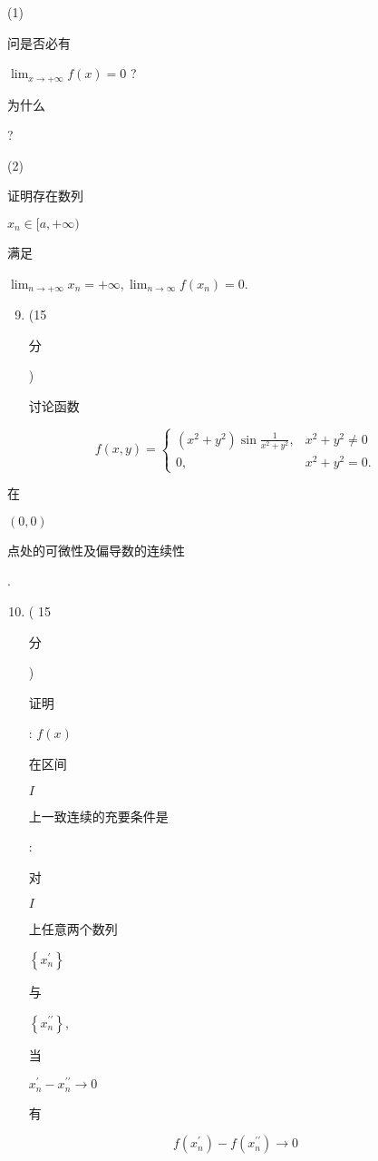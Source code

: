 \documentclass[10pt]{article}
\begin{document}
(1) \begin{CJK}{UTF8}{mj}问是否必有\end{CJK} $\lim _{x \rightarrow+\infty} f(x)=0$ ? \begin{CJK}{UTF8}{mj}为什么\end{CJK}?

(2) \begin{CJK}{UTF8}{mj}证明存在数列\end{CJK} $x_{n} \in[a,+\infty)$ \begin{CJK}{UTF8}{mj}满足\end{CJK} $\lim _{n \rightarrow+\infty} x_{n}=+\infty, \lim _{n \rightarrow \infty} f\left(x_{n}\right)=0$.

\begin{enumerate}
  \setcounter{enumi}{8}
  \item (15 \begin{CJK}{UTF8}{mj}分\end{CJK}) \begin{CJK}{UTF8}{mj}讨论函数\end{CJK}
\end{enumerate}
$$
f(x, y)= \begin{cases}\left(x^{2}+y^{2}\right) \sin \frac{1}{x^{2}+y^{2}}, & x^{2}+y^{2} \neq 0 \\ 0, & x^{2}+y^{2}=0 .\end{cases}
$$
\begin{CJK}{UTF8}{mj}在\end{CJK} $(0,0)$ \begin{CJK}{UTF8}{mj}点处的可微性及偏导数的连续性\end{CJK}.

\begin{enumerate}
  \setcounter{enumi}{9}
  \item ( 15 \begin{CJK}{UTF8}{mj}分\end{CJK}) \begin{CJK}{UTF8}{mj}证明\end{CJK}: $f(x)$ \begin{CJK}{UTF8}{mj}在区间\end{CJK} $I$ \begin{CJK}{UTF8}{mj}上一致连续的充要条件是\end{CJK}: \begin{CJK}{UTF8}{mj}对\end{CJK} $I$ \begin{CJK}{UTF8}{mj}上任意两个数列\end{CJK} $\left\{x_{n}^{\prime}\right\}$ \begin{CJK}{UTF8}{mj}与\end{CJK} $\left\{x_{n}^{\prime \prime}\right\}$, \begin{CJK}{UTF8}{mj}当\end{CJK} $x_{n}^{\prime}-x_{n}^{\prime \prime} \rightarrow 0$ \begin{CJK}{UTF8}{mj}有\end{CJK}
\end{enumerate}
$$
f\left(x_{n}^{\prime}\right)-f\left(x_{n}^{\prime \prime}\right) \rightarrow 0
$$
\end{document}
